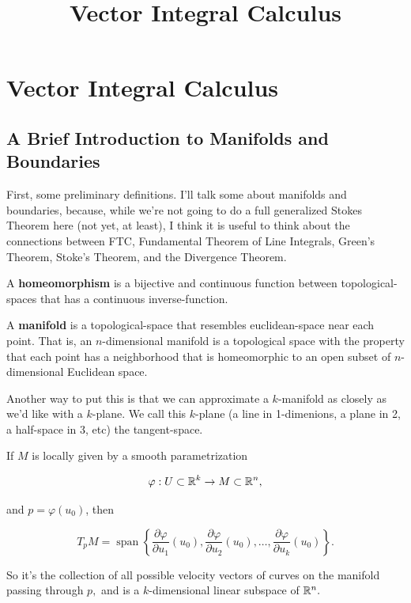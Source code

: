 \documentclass{article}
\title{Vector Integral Calculus}
\begin{document}
\section{Vector Integral Calculus}

\subsection{A Brief Introduction to Manifolds and Boundaries}

First, some preliminary definitions. I'll talk some about \@{manifolds} and \@{boundaries}, because, while we're not going to do a full generalized Stokes Theorem here (not yet, at least), I think it is useful to think about the connections between FTC, Fundamental Theorem of Line Integrals, Green's Theorem, Stoke's Theorem, and the Divergence Theorem.

\begin{definition}[Homeomorphism]
A \textbf{homeomorphism} is a \@{bijective} and \@{continuous} \@{function} between \@{topological-spaces} that has a \@{continuous} \@{inverse-function}.
\end{definition}

\begin{definition}[Manifold]
A \textbf{manifold} is a \@{topological-space} that resembles \@{euclidean-space} near each point. That is, an $n$-dimensional manifold is a topological space with the property that each \@{point} has a \@{neighborhood} that is \@{homeomorphic} to an \@{open} \@{subset} of $n$-dimensional Euclidean space.
\end{definition}

\begin{remark}
Another way to put this is that we can approximate a $k$-manifold as closely as we'd like with a $k$-plane. We call this $k$-plane (a line in 1-dimenions, a plane in 2, a half-space in 3, etc) the \@{tangent-space}.
\end{remark}

\begin{definition}
If $M$ is locally given by a \@{smooth} parametrization

\[ \varphi : U \subset \mathbb{R}^k \to M \subset \mathbb{R}^n, \]

and $p = \varphi(u_0)$, then

\[ T_p M = \operatorname{span}\left\{
\frac{\partial \varphi}{\partial u_1}(u_0),
\frac{\partial \varphi}{\partial u_2}(u_0),
\dots,
\frac{\partial \varphi}{\partial u_k}(u_0)
\right\}. \]

So it’s the collection of all possible velocity \@{vectors} of curves on the \@{manifold} passing through $p,$ and is a $k$-dimensional linear subspace of $\mathbb{R}^n.$
\end{definition}
\end{document}

